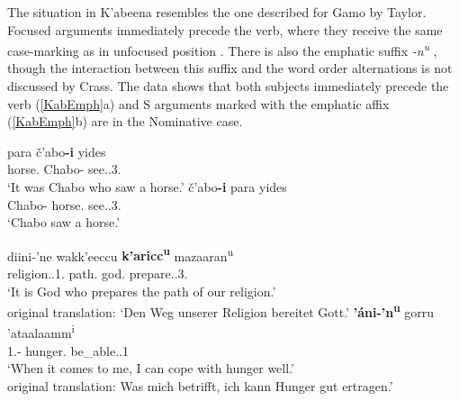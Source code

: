 The situation in K'abeena resembles the one described for Gamo by Taylor. 
Focused arguments immediately precede the verb, where they receive the same case-marking as in unfocused position \citep[327]{Crass:2005}.
There is also the emphatic suffix \emph{-n\textsuperscript{u}} \citep[256]{Crass:2005}, though the interaction between this suffix and the word order alternations is not discussed by Crass. 
The data shows that both subjects immediately precede the verb (\ref{KabEmph}a) and S arguments marked with the emphatic affix (\ref{KabEmph}b) are in the Nominative case. %

\begin{exe}\ex\label{GamEmph}
\begin{xlist} 
\ex\gll para \v c'abo\textbf{-i} yides\\
horse.\acc{} Chabo-\nom{} see.\prf{}.3\sg{}.\mas{}\\
\glt `It was Chabo who saw a horse.'
\ex\gll \v c'abo\textbf{-i} para yides\\
Chabo-\nom{} horse.\acc{} see.\prf{}.3\sg{}.\mas{}\\
\glt `Chabo saw a horse.'
\end{xlist}
\end{exe}

\enlargethispage{\baselineskip}
\begin{exe}\ex\label{KabEmph}
\begin{xlist} 
\ex\gll diini-'ne wakk'eeccu \textbf{k'aricc\textsuperscript{u}} mazaaran\textsuperscript{u}\\
religion.\gen{}.1\pl{}.\poss{} path.\acc{} god.\nom{} prepare.\ipfv{}.3\sg{}.\mas{}\\
\glt `It is God who prepares the path of our religion.' \\
original translation: `Den Weg unserer Religion bereitet Gott.'
\ex\gll \textbf{'\'ani-'n\textsuperscript{u}} gorru 'ataalaamm\textsuperscript{i} \\
1\sg{}.\nom{}-\emphat{} hunger.\acc{} be\_able.\ipfv{}.1\sg{} \\
\glt `When it comes to me, I can cope with hunger well.' \\
original translation: Was mich betrifft, ich kann Hunger gut ertragen.'
\end{xlist}
\end{exe}


